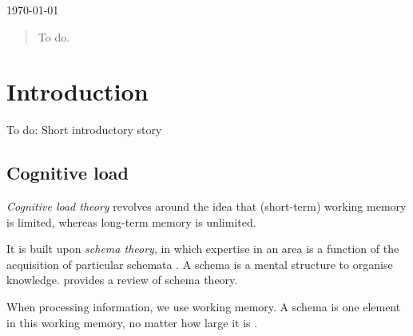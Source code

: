 \documentclass[11pt,leqno,letterpaper]{report} %
\begin{document}
\begin{titlepage}

{\large \today}\\[3cm] %


 

\vfill %

\end{titlepage}

\begin{abstract}
To do.
\end{abstract}

\tableofcontents 
{}



\chapter{Introduction}

To do: Short introductory story

\section{Cognitive load}
\emph{Cognitive load theory} \citep{Sweller1994} revolves around the idea that (short-term) working memory is limited, whereas long-term memory is unlimited. 

It is built upon \emph{schema theory}, in which expertise in an area is a function of the acquisition of particular schemata \citep{bartlett1995remembering}. A schema is a mental structure to organise knowledge. \citep{mcvee2005schema} provides a review of schema theory.

When processing information, we use working memory. A schema is one element in this working memory, no matter how large it is \citep{mayer2014cambridge}. 
\end{document}
